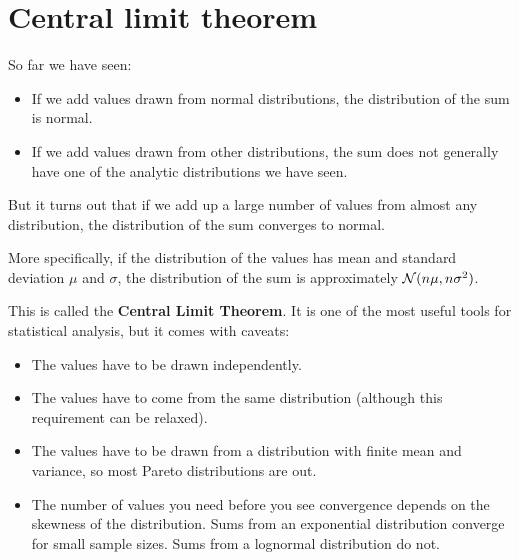 \documentclass[12pt]{book}
\begin{document}
\section{Central limit theorem}
\label{CLT}

So far we have seen:

\begin{itemize}

\item If we add values drawn from normal distributions, the distribution
of the sum is normal.

\item If we add values drawn from other distributions, the sum does not
generally have one of the analytic distributions we have seen.

\end{itemize}

But it turns out that if we add up a large number of values from
almost any distribution, the distribution of the sum converges to
normal.

More specifically, if the distribution of the values has mean and
standard deviation $\mu$ and $\sigma$, the distribution of the sum is
approximately $\mathcal{N}(n \mu, n \sigma^2)$.

This is called the {\bf Central Limit Theorem}.  It is one of the
most useful tools for statistical analysis, but it comes with
caveats:

\begin{itemize}

\item The values have to be drawn independently.

\item The values have to come from the same distribution (although
  this requirement can be relaxed).

\item The values have to be drawn
  from a distribution with finite mean and variance, so most Pareto
  distributions are out.

\item The number of values you need before you see convergence depends
  on the skewness of the distribution.  Sums from an exponential
  distribution converge for small sample sizes.  Sums from a
  lognormal distribution do not.

\end{itemize}
\end{document}

